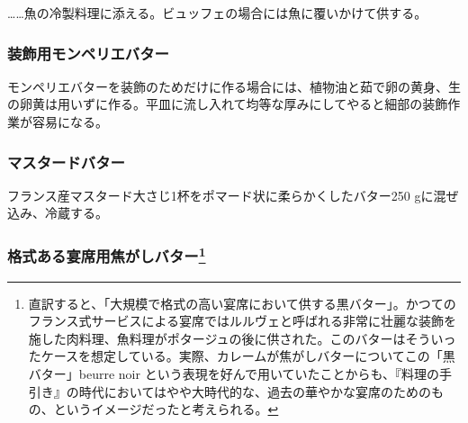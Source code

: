 \begin{recette}
\ldots{}\ldots{}魚の冷製料理に添える。ビュッフェの場合には魚に覆いかけて供する。

\hypertarget{beurre-de-montpellier-pour-croutonnage-de-plats}{%
\subsubsection{装飾用モンペリエバター}\label{beurre-de-montpellier-pour-croutonnage-de-plats}}



モンペリエバターを装飾のためだけに作る場合には、植物油と茹で卵の黄身、生の卵黄は用いずに作る。平皿に流し入れて均等な厚みにしてやると細部の装飾作業が容易になる。

\hypertarget{beurre-de-moutarde}{%
\subsubsection{マスタードバター}\label{beurre-de-moutarde}}



フランス産マスタード大さじ1\undemi{}杯をポマード状に柔らかくしたバター250
gに混ぜ込み、冷蔵する。

\hypertarget{beurre-noir-pour-les-grands-services}{%
\subsubsection[格式ある宴席用焦がしバター]{\texorpdfstring{格式ある宴席用焦がしバター\footnote{直訳すると、「大規模で格式の高い宴席において供する黒バター」。かつてのフランス式サービスによる宴席ではルルヴェと呼ばれる非常に壮麗な装飾を施した肉料理、魚料理がポタージュの後に供された。このバターはそういったケースを想定している。実際、カレームが焦がしバターについてこの「黒バター」beurre
  noir
  という表現を好んで用いていたことからも、『料理の手引き』の時代においてはやや大時代的な、過去の華やかな宴席のためのもの、というイメージだったと考えられる。}}{格式ある宴席用焦がしバター}}\label{beurre-noir-pour-les-grands-services}}


\end{recette}

